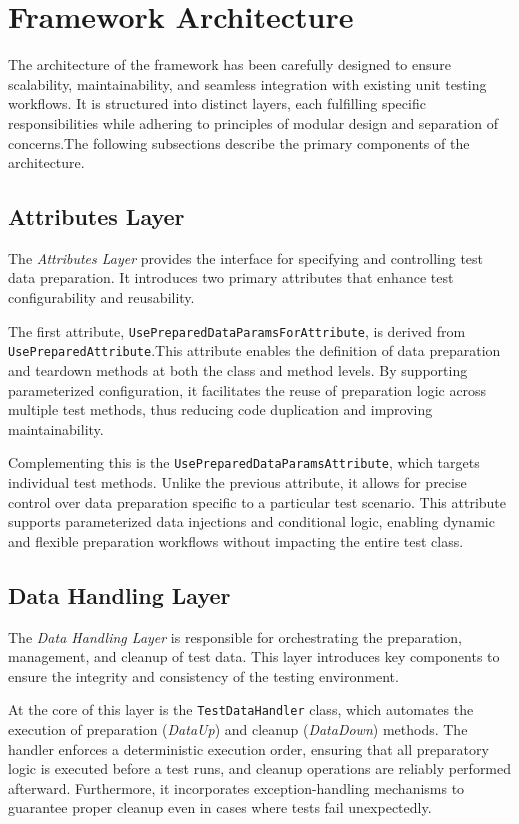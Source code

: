 
\section{Framework Architecture}

The architecture of the framework has been carefully designed to ensure scalability,
maintainability, and seamless integration with existing unit testing workflows.
It is structured into distinct layers,
each fulfilling specific responsibilities while adhering to principles of modular design and separation of concerns.The following subsections describe the primary components of the architecture.

\subsection{Attributes Layer}
The \textit{Attributes Layer} provides the interface for specifying and controlling test data preparation. It introduces two primary attributes that enhance test configurability and reusability.

The first attribute, \texttt{UsePreparedDataParamsForAttribute}, is derived from \texttt{UsePreparedAttribute}.This attribute enables the definition of data preparation and teardown methods at both the class and method levels. 
By supporting parameterized configuration, it facilitates the reuse of preparation logic across multiple test methods, thus reducing code duplication and improving maintainability.

Complementing this is the \texttt{UsePreparedDataParamsAttribute}, which targets individual test methods. Unlike the previous attribute, it allows for precise control over data preparation specific to a particular test scenario. This attribute supports parameterized data injections and conditional logic, enabling dynamic and flexible preparation workflows without impacting the entire test class.

\subsection{Data Handling Layer}
The \textit{Data Handling Layer} is responsible for orchestrating the preparation, management, and cleanup of test data. This layer introduces key components to ensure the integrity and consistency of the testing environment.

At the core of this layer is the \texttt{TestDataHandler} class, which automates the execution of preparation (\textit{DataUp}) and cleanup (\textit{DataDown}) methods. The handler enforces a deterministic execution order, ensuring that all preparatory logic is executed before a test runs, and cleanup operations are reliably performed afterward. Furthermore, it incorporates exception-handling mechanisms to guarantee proper cleanup even in cases where tests fail unexpectedly.

